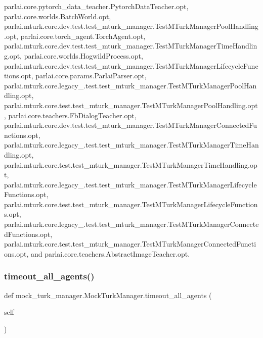 parlai.\+core.\+pytorch\+\_\+data\+\_\+teacher.\+Pytorch\+Data\+Teacher.\+opt, parlai.\+core.\+worlds.\+Batch\+World.\+opt, parlai.\+mturk.\+core.\+dev.\+test.\+test\+\_\+mturk\+\_\+manager.\+Test\+M\+Turk\+Manager\+Pool\+Handling.\+opt, parlai.\+core.\+torch\+\_\+agent.\+Torch\+Agent.\+opt, parlai.\+mturk.\+core.\+dev.\+test.\+test\+\_\+mturk\+\_\+manager.\+Test\+M\+Turk\+Manager\+Time\+Handling.\+opt, parlai.\+core.\+worlds.\+Hogwild\+Process.\+opt, parlai.\+mturk.\+core.\+dev.\+test.\+test\+\_\+mturk\+\_\+manager.\+Test\+M\+Turk\+Manager\+Lifecycle\+Functions.\+opt, parlai.\+core.\+params.\+Parlai\+Parser.\+opt, parlai.\+mturk.\+core.\+legacy\+\_.\+test.\+test\+\_\+mturk\+\_\+manager.\+Test\+M\+Turk\+Manager\+Pool\+Handling.\+opt, parlai.\+mturk.\+core.\+test.\+test\+\_\+mturk\+\_\+manager.\+Test\+M\+Turk\+Manager\+Pool\+Handling.\+opt, parlai.\+core.\+teachers.\+Fb\+Dialog\+Teacher.\+opt, parlai.\+mturk.\+core.\+dev.\+test.\+test\+\_\+mturk\+\_\+manager.\+Test\+M\+Turk\+Manager\+Connected\+Functions.\+opt, parlai.\+mturk.\+core.\+legacy\+\_.\+test.\+test\+\_\+mturk\+\_\+manager.\+Test\+M\+Turk\+Manager\+Time\+Handling.\+opt, parlai.\+mturk.\+core.\+test.\+test\+\_\+mturk\+\_\+manager.\+Test\+M\+Turk\+Manager\+Time\+Handling.\+opt, parlai.\+mturk.\+core.\+legacy\+\_.\+test.\+test\+\_\+mturk\+\_\+manager.\+Test\+M\+Turk\+Manager\+Lifecycle\+Functions.\+opt, parlai.\+mturk.\+core.\+test.\+test\+\_\+mturk\+\_\+manager.\+Test\+M\+Turk\+Manager\+Lifecycle\+Functions.\+opt, parlai.\+mturk.\+core.\+legacy\+\_.\+test.\+test\+\_\+mturk\+\_\+manager.\+Test\+M\+Turk\+Manager\+Connected\+Functions.\+opt, parlai.\+mturk.\+core.\+test.\+test\+\_\+mturk\+\_\+manager.\+Test\+M\+Turk\+Manager\+Connected\+Functions.\+opt, and parlai.\+core.\+teachers.\+Abstract\+Image\+Teacher.\+opt.

\mbox{\label{classmock__turk__manager_1_1MockTurkManager_a71af67cf6b49970649e8fe697d7fef77}} 
\subsubsection{\texorpdfstring{timeout\+\_\+all\+\_\+agents()}{timeout\_all\_agents()}}
{\footnotesize\ttfamily def mock\+\_\+turk\+\_\+manager.\+Mock\+Turk\+Manager.\+timeout\+\_\+all\+\_\+agents (\begin{DoxyParamCaption}\item[{}]{self }\end{DoxyParamCaption})}

